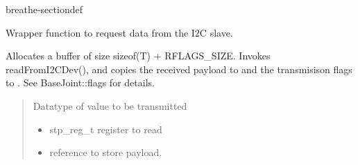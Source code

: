 \documentclass[letterpaper,10pt,english]{sphinxmanual}
\begin{document}
\begin{fulllineitems}
\begin{sphinxuseclass}{breathe-sectiondef}
\begin{fulllineitems}
\label{\detokenize{code/bioscara_hardware_drivers/index:_CPPv4I0EN25bioscara_hardware_drivers25bioscara_hardware_drivers5Joint4readEiK9stp_reg_tR1TR8u_int8_t}}\label{\detokenize{code/bioscara_hardware_drivers/index:_CPPv3I0EN25bioscara_hardware_drivers25bioscara_hardware_drivers5Joint4readEK9stp_reg_tR1TR8u_int8_t}}\label{\detokenize{code/bioscara_hardware_drivers/index:_CPPv2I0EN25bioscara_hardware_drivers25bioscara_hardware_drivers5Joint4readEK9stp_reg_tR1TR8u_int8_t}}
\pysigstartsignatures
\pysigstartmultiline
\pysigline
{}
\pysiglinewithargsret
{\label{\detokenize{code/bioscara_hardware_drivers/index:classbioscara__hardware__drivers_1_1Joint_1a81a8e4841ae03d04498d2f6ef3c08d82}}}
{\sphinxparamcomma {}}
{}
\pysigstopmultiline
\pysigstopsignatures
\sphinxAtStartPar
Wrapper function to request data from the I2C slave. 

\sphinxAtStartPar
Allocates a buffer of size sizeof(T) + RFLAGS\_SIZE. Invokes readFromI2CDev(), and copies the received payload to  and the transmisison flags to . See BaseJoint::flags for details.
\begin{quote}\begin{description}
\sphinxAtStartPar
{} \textendash{} Datatype of value to be transmitted 

\begin{itemize}
\item {} 
\sphinxAtStartPar
{} \textendash{} stp\_reg\_t register to read 

\item {} 
\sphinxAtStartPar
{} \textendash{} reference to store payload. 


\end{itemize}
\end{description}
\end{quote}
\end{fulllineitems}
\end{sphinxuseclass}
\end{fulllineitems}
\end{document}

